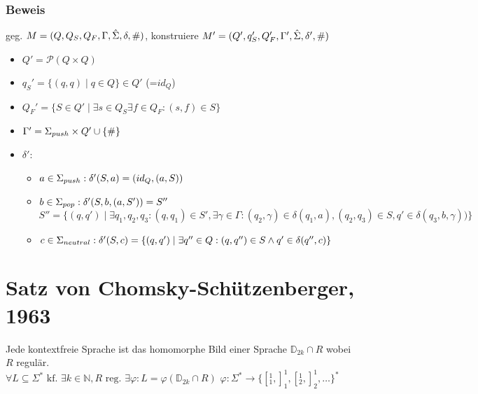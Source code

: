     \subsubsection{Beweis}
    geg. $M=(Q,Q_S,Q_F,\Gamma,\hat{\Sigma},\delta,\#)$, konstruiere $M'=(Q',q_S',Q_F',\Gamma',\hat{\Sigma},\delta',\#)$
    \begin{itemize}
        \item $Q'=\mathcal{P}(Q\times Q)$
        \item $q_S'=\{(q,q)\mid q\in Q\}\in Q'$ (=$id_Q$)
        \item $Q_F'=\{S\in Q'\mid \exists s\in Q_S\exists f\in Q_F: (s,f)\in S\}$
        \item $\Gamma'=\Sigma_{push}\times Q'\cup \{\#\}$
        \item $\delta'$:
        \begin{itemize}
            \item $a\in\Sigma_{push}: \delta'(S,a)=(id_Q,(a,S))$
            \item $b\in\Sigma_{pop} : \delta'(S,b,(a,S'))=S''$\\%
            $S''=\{(q,q')\mid\exists q_1,q_2,q_3: (q,q_1)\in S', \exists\gamma\in\Gamma:(q_2,\gamma)\in\delta(q_1,a), (q_2,q_3)\in S, q'\in\delta(q_3,b,\gamma))\}$
            \item $c\in\Sigma_{neutral}: \delta'(S,c)=\{(q,q')\mid \exists q''\in Q: (q,q'')\in S\wedge q'\in \delta(q'',c)\}$
        \end{itemize}
    \end{itemize}
\section{Satz von Chomsky-Schützenberger, 1963}
    Jede kontextfreie Sprache ist das homomorphe Bild einer Sprache $\mathds{D}_{2k}\cap R$ wobei $R$ regulär.\\
    $\forall L\subseteq \Sigma^*\text{ kf. }\exists k\in\mathds{N}, R\text{ reg. }\exists\varphi:L=\varphi(\mathds{D}_{2k}\cap R)$ $\varphi:\Sigma^*\rightarrow \{[_1^1,]_1^1,[_2^1,]_2^1,\dots\}^*$
